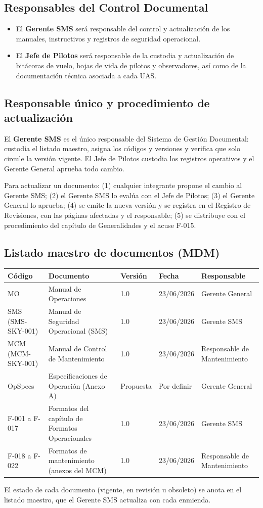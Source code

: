 \subsection{Responsables del Control Documental}
\begin{itemize}
    \item El \textbf{Gerente SMS} será responsable del control y actualización de los manuales, instructivos y registros de seguridad operacional.
    \item El \textbf{Jefe de Pilotos} será responsable de la custodia y actualización de bitácoras de vuelo, hojas de vida de pilotos y observadores, así como de la documentación técnica asociada a cada UAS.
\end{itemize}


\subsection{Responsable único y procedimiento de actualización}
El \textbf{Gerente SMS} es el único responsable del Sistema de Gestión Documental: custodia el listado maestro, asigna los códigos y versiones y verifica que solo circule la versión vigente. El Jefe de Pilotos custodia los registros operativos y el Gerente General aprueba todo cambio.

Para actualizar un documento: (1) cualquier integrante propone el cambio al Gerente SMS; (2) el Gerente SMS lo evalúa con el Jefe de Pilotos; (3) el Gerente General lo aprueba; (4) se emite la nueva versión y se registra en el Registro de Revisiones, con las páginas afectadas y el responsable; (5) se distribuye con el procedimiento del capítulo de Generalidades y el acuse F-015.

\subsection{Listado maestro de documentos (MDM)}
\renewcommand{\arraystretch}{1.3}
\begin{longtable}{|p{3.4cm}|p{4.4cm}|p{1.4cm}|p{2.2cm}|p{2.6cm}|}
\hline
\textbf{Código} & \textbf{Documento} & \textbf{Versión} & \textbf{Fecha} & \textbf{Responsable} \\ \hline
MO & Manual de Operaciones & 1.0 & 23/06/2026 & Gerente General \\ \hline
SMS (SMS-SKY-001) & Manual de Seguridad Operacional (SMS) & 1.0 & 23/06/2026 & Gerente SMS \\ \hline
MCM (MCM-SKY-001) & Manual de Control de Mantenimiento & 1.0 & 23/06/2026 & Responsable de Mantenimiento \\ \hline
OpSpecs & Especificaciones de Operación (Anexo A) & Propuesta & Por definir & Gerente General \\ \hline
F-001 a F-017 & Formatos del capítulo de Formatos Operacionales & 1.0 & 23/06/2026 & Gerente SMS \\ \hline
F-018 a F-022 & Formatos de mantenimiento (anexos del MCM) & 1.0 & 23/06/2026 & Responsable de Mantenimiento \\ \hline
\end{longtable}
El estado de cada documento (vigente, en revisión u obsoleto) se anota en el listado maestro, que el Gerente SMS actualiza con cada enmienda.


